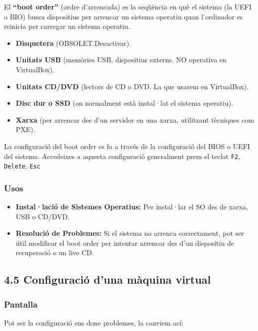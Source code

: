 \documentclass[
  12 pt,
  a4paper,
]{article}
\providecommand{\tightlist}{%
  \setlength{\itemsep}{0pt}\setlength{\parskip}{0pt}}
\begin{document}
El \textbf{``boot order''} (ordre d'arrencada) es la seqüència en què el
sistema (la UEFI o BIO) busca dispositius per arrencar un sistema
operatiu quan l'ordinador es reinicia per carregar un sistema operatiu.

\begin{itemize}
\tightlist
\item
  \textbf{Disquetera} (OBSOLET.Desactivar).
\item
  \textbf{Unitats USB} (memòries USB, dispositius externs. NO operativa
  en VirtualBox).
\item
  \textbf{Unitats CD/DVD} (lectors de CD o DVD. La que usarem en
  VirtualBox).
\item
  \textbf{Disc dur o SSD} (on normalment està instal·lat el sistema
  operatiu).
\item
  \textbf{Xarxa} (per arrencar des d'un servidor en una xarxa,
  utilitzant tècniques com PXE).
\end{itemize}

La configuració del boot order es fa a través de la configuració del
BIOS o UEFI del sistema. Accedeixes a aquesta configuració generalment
prem el teclat \texttt{F2}, \texttt{Delete}, \texttt{Esc}

\subsubsection{Usos}\label{usos}

\begin{itemize}
\tightlist
\item
  \textbf{Instal·lació de Sistemes Operatius:} Per instal·lar el SO des
  de xarxa, USB o CD/DVD.
\item
  \textbf{Resolució de Problemes:} Si el sistema no arrenca
  correctament, pot ser útil modificar el boot order per intentar
  arrencar des d'un dispositiu de recuperació o un live CD.
\end{itemize}

\subsection{4.5 Configuració d'una màquina
virtual}\label{configuraciuxf3-duna-muxe0quina-virtual}

\subsubsection{Pantalla}\label{pantalla}

Pot ser la configuració ens done problemes, la canviem ací:
\end{document}
